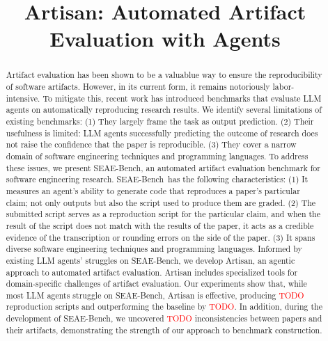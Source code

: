 \documentclass[acmsmall,screen,review,anonymous]{acmart}
\begin{document}
\newcommand\benchmark{SEAE-Bench}


\newcommand\todo[1]{\textcolor{red}{TODO: #1}}
\newcommand\artisanpartial{\textcolor{red}{TODO}}
\newcommand\artisanpartialoutperform{\textcolor{red}{TODO}}
\newcommand\inconsistencies{\textcolor{red}{TODO}}

\title{Artisan: Automated Artifact Evaluation with Agents}
\begin{abstract}
Artifact evaluation has been shown to be a valuablue way to ensure the reproducibility of software artifacts.
However, in its current form, it remains notoriously labor-intensive.
To mitigate this, recent work has introduced benchmarks that evaluate LLM agents on automatically reproducing research results.
We identify several limitations of existing benchmarks:
(1) They largely frame the task as output prediction.
(2) Their usefulness is limited: LLM agents successfully predicting the outcome of research does not raise the confidence that the paper is reproducible.
(3) They cover a narrow domain of software engineering techniques and programming languages.
To address these issues, we present \benchmark, an automated artifact evaluation benchmark for software engineering research.
\benchmark~has the following characteristics:
(1) It measures an agent’s ability to generate code that reproduces a paper’s particular claim; not only outputs but also the script used to produce them are graded.
(2) The submitted script serves as a reproduction script for the particular claim, and when the result of the script does not match with the results of the paper, it acts as a credible evidence of the transcription or rounding errors on the side of the paper.
(3) It spans diverse software engineering techniques and programming languages.
Informed by existing LLM agents’ struggles on \benchmark, we develop Artisan, an agentic approach to automated artifact evaluation.
Artisan includes specialized tools for domain-specific challenges of artifact evaluation.
Our experiments show that, while most LLM agents struggle on \benchmark, Artisan is effective, producing \artisanpartial{} reproduction scripts and outperforming the baseline by \artisanpartialoutperform{}.
In addition, during the development of \benchmark, we uncovered \inconsistencies{} inconsistencies between papers and their artifacts, demonstrating the strength of our approach to benchmark construction.
\end{abstract}
\maketitle










\end{document}
